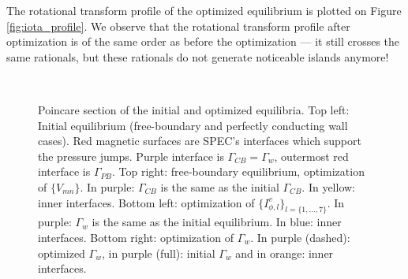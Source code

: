 
The rotational transform profile of the optimized equilibrium is plotted on Figure \ref{fig:iota_profile}. We observe that the rotational transform profile after optimization is of the same order as before the optimization --- it still crosses the same rationals, but these rationals do not generate noticeable islands anymore!

\begin{figure}
\centering
\hfill
{}
\hfill
{}
\hfill \\
\centering
\hfill
{}
\hfill
{}
\hfill
\caption{Poincare section of the initial and optimized equilibria. Top left: Initial equilibrium (free-boundary and perfectly conducting wall cases). Red magnetic surfaces are SPEC's interfaces which support the pressure jumps. Purple interface is $\Gamma_{CB}=\Gamma_w$, outermost red interface is $\Gamma_{PB}$. Top right: free-boundary equilibrium, optimization of $\{V_{mn}\}$. In purple: $\Gamma_{CB}$ is the same as the initial $\Gamma_{CB}$. In yellow:  inner interfaces. Bottom left: optimization of $\{I^v_{\phi,l}\}_{l=\{1,\ldots,7\}}$. In purple: $\Gamma_w$ is the same as the initial equilibrium. In blue: inner interfaces. Bottom right: optimization of $\Gamma_w$. In purple (dashed): optimized $\Gamma_w$, in purple (full): initial $\Gamma_w$ and in orange: inner interfaces.}
\label{fig:poincare_plots}
\end{figure}


